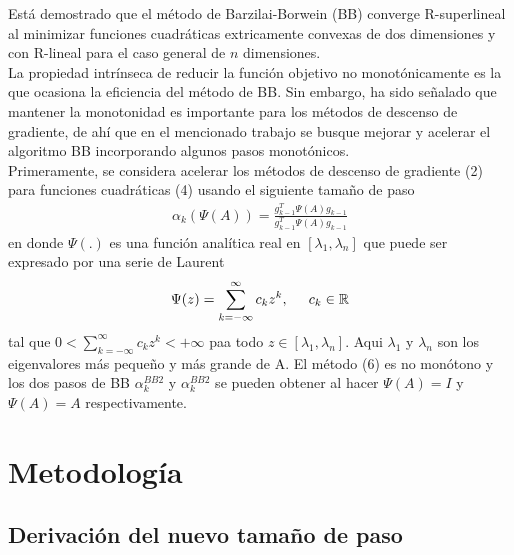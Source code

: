 \documentclass[conference]{IEEEtran}
\begin{document}
    Está demostrado que el método de Barzilai-Borwein (BB) converge R-superlineal al minimizar funciones cuadráticas extricamente convexas de dos dimensiones y con R-lineal para el caso general de $n$ dimensiones.\\
    La propiedad intrínseca de reducir la función objetivo no monotónicamente es la que ocasiona la eficiencia del método de BB. Sin embargo, ha sido señalado que mantener la monotonidad es importante para los métodos de descenso de gradiente, de ahí que en el mencionado trabajo  se busque mejorar y acelerar el algoritmo BB incorporando algunos pasos monotónicos.\\

    Primeramente, se considera acelerar los métodos de descenso de gradiente (2) para funciones cuadráticas (4) usando el siguiente tamaño de paso
    \begin{align}
        \alpha_k(\Psi(A)) = \frac{g_{k-1}^T \Psi(A)g_{k-1}}{g_{k-1}^T \Psi(A) g_{k-1}}
    \end{align}
    en donde $\Psi(.)$ es una función analítica real en $[\lambda_1, \lambda_n]$ que puede ser expresado por una serie de Laurent
    \begin{align*}
        \Psi(z) = \sum_{k= - \infty}^\infty c_k z^k, \hspace{0.5cm} c_k \in \mathbb{R}
    \end{align*}
    tal que $0 < \sum_{k = -\infty}^\infty c_k z^k < + \infty$ paa todo $z \in [\lambda_1, \lambda_n]$. Aqui $\lambda_1$ y $\lambda_n$ son los eigenvalores más pequeño y más grande de A.  El método (6) es no monótono y los dos pasos de BB $\alpha_k ^{BB2}$ y $\alpha_k^{BB2}$ se pueden obtener al hacer $\Psi(A) = I$ y $\Psi(A) = A$ respectivamente.

    \section{Metodología}

    \subsection{Derivación del nuevo tamaño de paso}
\end{document}
